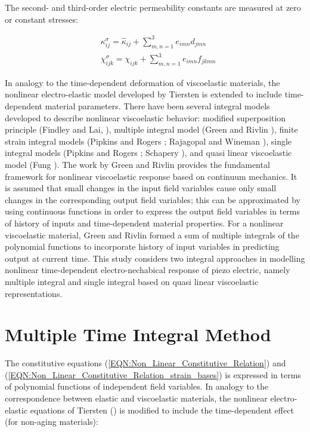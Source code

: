 The second- and third-order electric permeability constants are measured at zero or constant stresses:

\begin{equation}
\begin{aligned}
& {\kappa^{\sigma}_{ij}}= {\hat{\kappa}_{ij}}+\sum_{m,n=1}^3  e_{imn} d_{jmn} \\
& \chi^{\sigma}_{ijk} =    \chi_{ijk}+ \sum_{m,n=1}^3 e_{imn} f_{jkmn}
\end{aligned}
\label{EQN:Non_relation_with_constants_2} 
\end{equation}
 
In analogy to the time-dependent deformation of viscoelastic materials, the nonlinear electro-elastic model developed by Tiersten \cite{tiersten1993electroelastic} is extended to include time-dependent material parameters. 
There have been several integral models developed to describe nonlinear viscoelastic behavior:
 modified superposition principle (Findley and Lai, \cite{Findley1976}),
  multiple integral model (Green and Rivlin \cite{green1959mechanics}),
   finite strain integral models (Pipkins and Rogers \cite{pipkin1968non};
    Rajagopal and Wineman \cite{Wineman2000}),
     single integral models (Pipkins and Rogers \cite{pipkin1968non}; Schapery \cite{schapery1969characterization}),
      and quasi linear viscoelastic model (Fung \cite{fung1981biomechanics}). 
The work by Green and Rivlin \cite{green1959mechanics} provides the fundamental framework for nonlinear viscoelastic response based on continuum mechanics.
 It is assumed that small changes in the input field variables cause only small changes in the corresponding output field variables;
  this can be approximated by using continuous functions in order to express the output field variables in terms of history of inputs and time-dependent material properties. 
For a nonlinear viscoelastic material,
 Green and Rivlin \cite{green1959mechanics} formed a sum of multiple integrals of the polynomial functions to incorporate history of input variables in predicting output at current time.
 This study considers two integral approaches in modelling nonlinear time-dependent electro-nechabical response of piezo electric,
  namely multiple integral and single integral based on quasi linear viscoelastic representations.

\section{Multiple Time Integral Method} 
The constitutive equations (\ref{EQN:Non_Linear_Constitutive_Relation}) and
(\ref{EQN:Non_Linear_Constitutive_Relation_strain_bases}) is expressed in terms of polynomial functions of independent field variables.
In analogy to the correspondence between elastic and viscoelastic materials,
 the nonlinear electro-elastic equations of Tiersten (\cite{tiersten1993electroelastic}) is modified to include the time-dependent effect (for non-aging materials):
  
